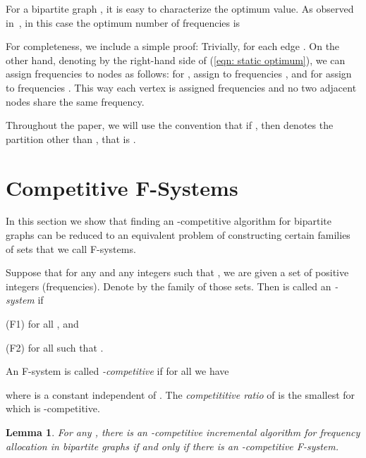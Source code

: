 \documentclass[11pt]{article}
\newtheorem{lemma}[theorem]{Lemma}
\begin{document}
For a bipartite graph , it is easy to characterize the
optimum value. As observed in~\cite{ChCYZZ06,ChrSga10}, in this case
the optimum number of frequencies is

For completeness, we include a simple proof: Trivially,
 for each edge . 
On the other hand, denoting by  the right-hand side of
(\ref{eqn: static optimum}), we can assign frequencies to
nodes as follows: for , assign to  frequencies
, and for  assign to  frequencies
. This way each vertex 
is assigned  frequencies and no two adjacent nodes
share the same frequency.

Throughout the paper, we will use the convention that
if , then 
 denotes the partition other than , that is 
.



\section{Competitive F-Systems}

In this section we show that finding an -competitive algorithm
for bipartite graphs can be reduced to an equivalent problem of
constructing certain families of sets that we call F-systems.

Suppose that for any  and any integers
 such that , we are given a set
 of positive integers (frequencies).
Denote by  the family of those sets.
Then  is called an \emph{-system} if
\begin{description}
	\item{(F1)}  for all , and
	\item{(F2)}  
	 	for all	 such that .
\end{description}
An F-system is called \emph{-competitive} if
for all  we have

where  is a constant independent of .
The \emph{competititive ratio} of  is the smallest  for
which  is -competitive.



\begin{lemma}\label{lem: incr alg equiv f-system}
For any , there is an -competitive incremental algorithm
for frequency allocation in bipartite graphs if and only if there
is an -competitive F-system.
\end{lemma}
\end{document}
